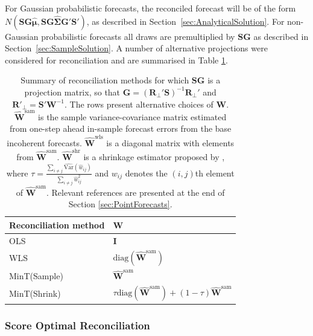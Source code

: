 \documentclass[12pt]{article}
\def\var{\text{Var}}
\theoremstyle{definition}
\begin{document}
For Gaussian probabilistic forecasts, the reconciled forecast will be of the form $N(\bm{S}\bm{G}\hat{\bm{\mu}},\bm{S}\bm{G}\hat{\bm{\Sigma}}\bm{G}'\bm{S}')$, as described in Section~\ref{sec:AnalyticalSolution}.  For non-Gaussian probabilistic forecasts all draws are premultiplied by $\bm{S}\bm{G}$ as described in Section~\ref{sec:SampleSolution}.  A number of alternative projections were considered for reconciliation and are summarised in Table \ref{tab:recomethods}.
\begin{table}[!t]
	\caption{Summary of reconciliation methods for which $\bm{S}\bm{G}$ is a projection matrix, so that ${\bm G}=(\bm{R}_{\perp}'\bm{S})^{-1}\bm{R}_{\perp}'$ and $\bm{R}'_\bot=\bm{S}'\bm{W}^{-1}$. The rows present alternative choices of $\bm{W}$. $\hat{\bm{W}}^{\text{sam}}$ is the sample variance-covariance matrix estimated from one-step ahead in-sample forecast errors from the base incoherent forecasts. $\hat{\bm{W}}^{\text{wls}}$ is a diagonal matrix with elements from $\hat{\bm{W}}^{\text{sam}}$. $\hat{\bm{W}}^{\text{shr}}$ is a shrinkage estimator proposed by \citet{Schafer2005},  where $\tau = \frac{\sum_{i \neq j}\hat{\var}(\hat{w}_{ij})}{\sum_{i \neq j}{\hat{w}}^2_{ij}}$ and  $w_{ij}$ denotes the $(i,j)$th element of $\hat{\bm{W}}^{\text{sam}}$. Relevant references are presented at the end of Section \ref{sec:PointForecasts}.} \label{tab:ReconMethods}
	\centering
	\begin{tabular}{l@{\hskip 0.4in}l}
		\toprule
		\textbf{Reconciliation method} & \textbf{$\bm{W}$} \\
		\midrule
		OLS             & $\bm{I}$ \\
		WLS             & $\text{diag}(\hat{\bm{W}}^{\text{sam}})$ \\
		MinT(Sample)    & $\hat{\bm{W}}^{\text{sam}}$ \\
		MinT(Shrink)    & $\tau\text{diag}(\hat{\bm{W}}^{\text{sam}}) + (1-\tau)\hat{\bm{W}}^{\text{sam}}$\\
		\bottomrule
	\end{tabular}
\label{tab:recomethods}
\end{table}

\subsubsection{Score Optimal Reconciliation}\label{sec:OptRec}
\end{document}
